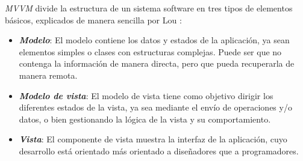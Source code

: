 \textit{MVVM} divide la estructura de un sistema software en tres tipos de elementos básicos, explicados de manera 
sencilla por Lou \autocite*{Lou2016}:
\begin{itemize}

    \item \textit{\textbf{Modelo}}: El modelo contiene los datos y estados de la aplicación, ya sean elementos 
    simples o clases con estructuras complejas. Puede ser que no contenga la información de manera directa, pero 
    que pueda recuperarla de manera remota. 

    \item \textit{\textbf{Modelo de vista}}: El modelo de vista tiene como objetivo dirigir los diferentes 
    estados de la vista, ya sea mediante el envío de operaciones y/o datos, o bien gestionando la lógica de la 
    vista y su comportamiento.
    
    \item \textit{\textbf{Vista}}: El componente de vista muestra la interfaz de la 
    aplicación, cuyo desarrollo está orientado más orientado a diseñadores que a programadores.

\end{itemize}
